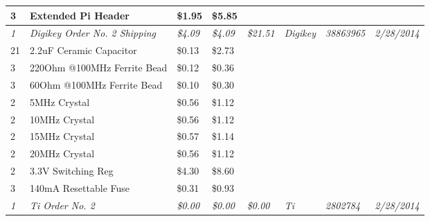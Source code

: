 \begin{table}[h]
{\begin{tabular}{llllllll}
3            & Extended Pi Header                                & \$1.95           & \$5.85           &                   &                   &                       &                     \\  \hline \hline
\textit{1}   & \textit{Digikey Order No. 2 Shipping}             & \textit{\$4.09}  & \textit{\$4.09}  & \textit{\$21.51}  & \textit{Digikey}  & \textit{38863965}     & \textit{2/28/2014}  \\
21           & 2.2uF Ceramic Capacitor                           & \$0.13           & \$2.73           &                   &                   &                       &                     \\
3            & 220Ohm @100MHz Ferrite Bead                       & \$0.12           & \$0.36           &                   &                   &                       &                     \\
3            & 60Ohm @100MHz Ferrite Bead                        & \$0.10           & \$0.30           &                   &                   &                       &                     \\
2            & 5MHz Crystal                                      & \$0.56           & \$1.12           &                   &                   &                       &                     \\
2            & 10MHz Crystal                                     & \$0.56           & \$1.12           &                   &                   &                       &                     \\
2            & 15MHz Crystal                                     & \$0.57           & \$1.14           &                   &                   &                       &                     \\
2            & 20MHz Crystal                                     & \$0.56           & \$1.12           &                   &                   &                       &                     \\
2            & 3.3V Switching Reg                                & \$4.30           & \$8.60           &                   &                   &                       &                     \\
3            & 140mA Resettable Fuse                             & \$0.31           & \$0.93           &                   &                   &                       &                     \\  \hline \hline
\textit{1}   & \textit{Ti Order No. 2}                           & \textit{\$0.00}  & \textit{\$0.00}  & \textit{\$0.00}   & \textit{Ti}       & \textit{2802784}      & \textit{2/28/2014}  \\

\end{tabular}}
\end{table}
